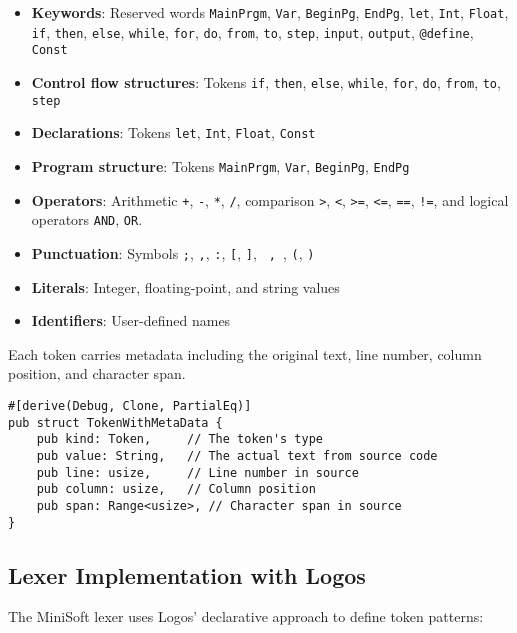 \documentclass[12pt,a4paper]{article}
\begin{document}
\begin{itemize}
	\item \textbf{Keywords}: Reserved words \texttt{MainPrgm}, \texttt{Var}, \texttt{BeginPg}, \texttt{EndPg}, \texttt{let}, \texttt{Int}, \texttt{Float}, \texttt{if}, \texttt{then}, \texttt{else}, \texttt{while}, \texttt{for}, \texttt{do}, \texttt{from}, \texttt{to}, \texttt{step}, \texttt{input}, \texttt{output}, \texttt{@define}, \texttt{Const}
	\item \textbf{Control flow structures}: Tokens \texttt{if}, \texttt{then}, \texttt{else}, \texttt{while}, \texttt{for}, \texttt{do}, \texttt{from}, \texttt{to}, \texttt{step}
	\item \textbf{Declarations}: Tokens \texttt{let}, \texttt{Int}, \texttt{Float}, \texttt{Const}
	\item \textbf{Program structure}: Tokens \texttt{MainPrgm}, \texttt{Var}, \texttt{BeginPg}, \texttt{EndPg}
	\item \textbf{Operators}: Arithmetic \texttt{+}, \texttt{-}, \texttt{*}, \texttt{/}, comparison \texttt{>}, \texttt{<}, \texttt{>=}, \texttt{<=}, \texttt{==}, \texttt{!=}, and logical operators \texttt{AND}, \texttt{OR}.
	\item \textbf{Punctuation}: Symbols \texttt{;}, \texttt{,}, \texttt{:}, \texttt{[}, \texttt{]}, \texttt{{} , \texttt{}}, \texttt{(}, \texttt{)}
	\item \textbf{Literals}: Integer, floating-point, and string values
	\item \textbf{Identifiers}: User-defined names
\end{itemize}

Each token carries metadata including the original text, line number, column position, and character span.

\begin{lstlisting}[caption={Token Structure}]
#[derive(Debug, Clone, PartialEq)]
pub struct TokenWithMetaData {
    pub kind: Token,     // The token's type
    pub value: String,   // The actual text from source code
    pub line: usize,     // Line number in source
    pub column: usize,   // Column position
    pub span: Range<usize>, // Character span in source
}
\end{lstlisting}

\subsection{Lexer Implementation with Logos}
The MiniSoft lexer uses Logos' declarative approach to define token patterns:
\end{document}
